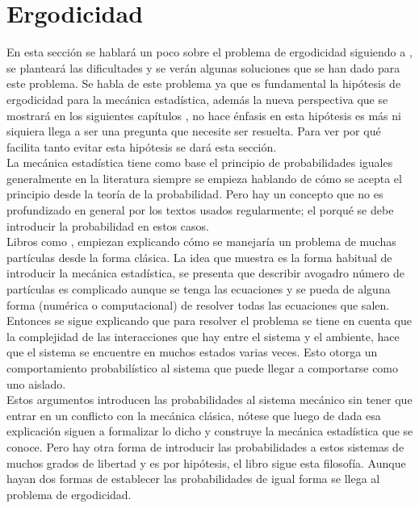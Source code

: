 \section{Ergodicidad}
En esta sección se hablará un poco sobre el problema de ergodicidad siguiendo a \cite{TodaStat}, se planteará las dificultades y se verán algunas soluciones que se han dado para este problema. Se habla de este problema ya que es fundamental la hipótesis de ergodicidad para la mecánica estadística, además la nueva perspectiva que se mostrará en los siguientes capítulos \cite{Popescu2006}, no hace énfasis en esta hipótesis es más ni siquiera llega a ser una pregunta que necesite ser resuelta. Para ver por qué facilita tanto evitar esta hipótesis se dará esta sección.
\\
La mecánica estadística tiene como base el principio de probabilidades iguales generalmente en la literatura siempre se empieza hablando de cómo se acepta el principio desde la teoría de la probabilidad. Pero hay un concepto que no es profundizado en general por los textos usados regularmente; el porqué se debe introducir la probabilidad en estos casos.\\
Libros como \cite{HuangStat},\cite{LandauStat} empiezan explicando cómo se manejaría un problema de muchas partículas desde la forma clásica. La idea que muestra es la forma habitual de introducir la mecánica estadística, se presenta que describir avogadro número de partículas es complicado aunque se  tenga las ecuaciones y se pueda de alguna forma (numérica o computacional) de resolver todas las ecuaciones que salen. Entonces se sigue explicando que para resolver el problema se tiene en cuenta que la complejidad de las	 interacciones que hay entre el sistema y el ambiente, hace que el sistema se encuentre en muchos estados varias veces. Esto otorga un comportamiento probabilístico al sistema que puede llegar a comportarse como uno aislado.
\\ 
Estos argumentos introducen las probabilidades al sistema mecánico sin tener que entrar en un conflicto con la mecánica clásica, nótese que luego de dada esa explicación siguen a formalizar lo dicho y construye la mecánica estadística que se conoce. Pero hay otra forma de introducir las probabilidades a estos sistemas de muchos grados de libertad y es por hipótesis, el libro \cite{KhinchinStat} sigue esta filosofía. Aunque hayan dos formas de establecer las probabilidades de igual forma se llega al problema de ergodicidad. 
\\

